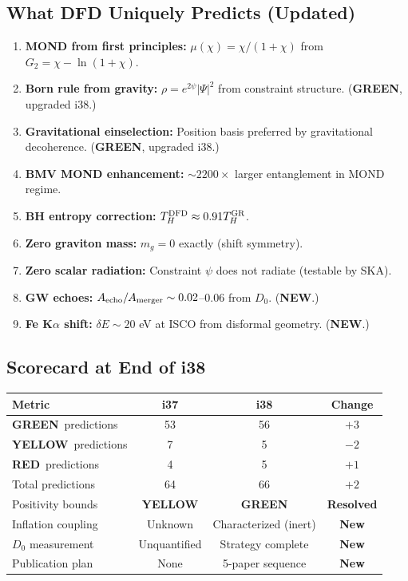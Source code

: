 \documentclass[11pt,a4paper]{article}
\newcommand{\GREEN}{\textcolor{dfdgreen}{\textbf{GREEN}}}
\newcommand{\YELLOW}{\textcolor{dfdyellow}{\textbf{YELLOW}}}
\newcommand{\RED}{\textcolor{dfdred}{\textbf{RED}}}
\newcommand{\NEW}{\textcolor{dfdblue}{\textbf{NEW}}}
\begin{document}
\subsection{What DFD Uniquely Predicts (Updated)}

\begin{enumerate}
\item \textbf{MOND from first principles:} $\mu(\chi) = \chi/(1+\chi)$ from $G_2 = \chi - \ln(1+\chi)$.
\item \textbf{Born rule from gravity:} $\rho = e^{2\psi}|\Psi|^2$ from constraint structure. (\GREEN, upgraded i38.)
\item \textbf{Gravitational einselection:} Position basis preferred by gravitational decoherence. (\GREEN, upgraded i38.)
\item \textbf{BMV MOND enhancement:} $\sim 2200\times$ larger entanglement in MOND regime.
\item \textbf{BH entropy correction:} $T_H^{\rm DFD} \approx 0.91 T_H^{\rm GR}$.
\item \textbf{Zero graviton mass:} $m_g = 0$ exactly (shift symmetry).
\item \textbf{Zero scalar radiation:} Constraint $\psi$ does not radiate (testable by SKA).
\item \textbf{GW echoes:} $A_{\rm echo}/A_{\rm merger} \sim 0.02$--$0.06$ from $D_0$. (\NEW.)
\item \textbf{Fe K$\alpha$ shift:} $\delta E \sim 20$ eV at ISCO from disformal geometry. (\NEW.)
\end{enumerate}

\subsection{Scorecard at End of i38}

\begin{center}
\begin{tabular}{lccc}
\toprule
\textbf{Metric} & \textbf{i37} & \textbf{i38} & \textbf{Change} \\
\midrule
\GREEN\ predictions & 53 & 56 & $+3$ \\
\YELLOW\ predictions & 7 & 5 & $-2$ \\
\RED\ predictions & 4 & 5 & $+1$ \\
Total predictions & 64 & 66 & $+2$ \\
\midrule
Positivity bounds & \YELLOW & \GREEN & \textbf{Resolved} \\
Inflation coupling & Unknown & Characterized (inert) & \textbf{New} \\
$D_0$ measurement & Unquantified & Strategy complete & \textbf{New} \\
Publication plan & None & 5-paper sequence & \textbf{New} \\
\bottomrule
\end{tabular}
\end{center}
\end{document}
